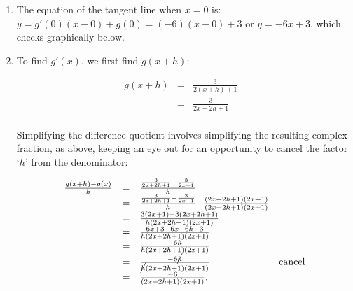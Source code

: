 \documentclass{ximera}
\begin{document}
\begin{example}
\begin{explanation}
\begin{enumerate}
\begin{enumerate}
 \[ \begin{array}{rclr} 

 \frac{g(0+h)-g(0)}{h} & = &  \frac{ \frac{3}{2h+1}-3}{h} & \\
& = &   \frac{ \frac{3}{2h+1}-3}{h} \cdot  \frac{(2h+1)}{(2h+1)} & \\
& = &   \frac{3-3(2h+1)}{h(2h+1)}  & \\
& = &   \frac{3 - 6 h - 3}{h(2h+1)}  & \\
& = &   \frac{-6h}{h(2h+1)}  & \\
& = &   \frac{-6\cancel{h}}{\cancel{h}(2h+1)}  & \text{cancel} \\
& = &   \frac{-6}{2h+1}.  & \\  \end{array} \]


We are now ready to take the limit:  \[g'(0) = \lim_{h \rightarrow 0} \frac{-6}{2h+1} = \frac{-6}{2(0)+1} = -6.\]

\item The equation of the tangent line when $x = 0$ is: $y = g'(0)(x-0) + g(0) = (-6)(x-0)+ 3$ or $y = -6x+3$, which checks graphically below.

 \begin{center}
 \end{center}



\item To find $g'(x)$, we first find $g(x+h)$:

 \[ \begin{array}{rclr}  
 g(x+h) & = &  \frac{3}{2(x+h)+1} & \\
 & = &  \frac{3}{2x+2h+1} \\
 \end{array} \]

Simplifying the difference quotient involves simplifying the resulting complex fraction, as above, keeping an eye out for an opportunity to cancel the factor `$h$' from the denominator:

 \[ \begin{array}{rclr} 

\frac{g(x+h)-g(x)}{h} & = & \frac{ \frac{3}{2x+2h+1}- \frac{3}{2x+1}}{h} & \\
& = &   \frac{ \frac{3}{2x+2h+1}- \frac{3}{2x+1}}{h} \cdot  \frac{(2x+2h+1)(2x+1)}{(2x+2h+1)(2x+1)} & \\
& = &  \frac{3(2x+1)-3(2x+2h+1)}{h(2x+2h+1)(2x+1)}  & \\
& = &  \frac{6x+3-6x-6h-3}{h(2x+2h+1)(2x+1)}  & \\
& = &   \frac{-6h}{h(2x+2h+1)(2x+1)}  & \\
& = &  \frac{-6\cancel{h}}{\cancel{h}(2x+2h+1)(2x+1)} & \text{cancel} \\
& = &   \frac{-6}{(2x+2h+1)(2x+1)}.  & \\  \end{array} \]


\end{enumerate}
\end{enumerate}
\end{explanation}
\end{example}
\end{document}
